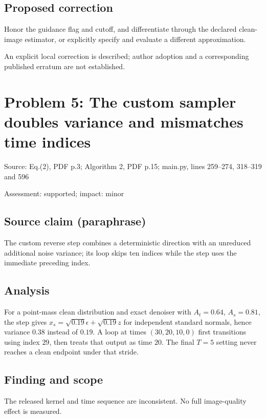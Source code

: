 \documentclass[11pt]{article}
\begin{document}
\subsection*{Proposed correction}

Honor the guidance flag and cutoff, and differentiate through the declared clean-image estimator, or explicitly specify and evaluate a different approximation.

An explicit local correction is described; author adoption and a corresponding published erratum are not established.

\section*{Problem 5: The custom sampler doubles variance and mismatches time indices}

Source: Eq.(2), PDF p.3; Algorithm 2, PDF p.15; main.py, lines 259–274, 318–319 and 596

Assessment: supported; impact: minor

\subsection*{Source claim (paraphrase)}

The custom reverse step combines a deterministic direction with an unreduced additional noise variance; its loop skips ten indices while the step uses the immediate preceding index.

\subsection*{Analysis}

For a point-mass clean distribution and exact denoiser with \(A_t=0.64\), \(A_s=0.81\), the step gives \(x_s=\sqrt{0.19}\epsilon+\sqrt{0.19}z\) for independent standard normals, hence variance \(0.38\) instead of \(0.19\). A loop at times \((30,20,10,0)\) first transitions using index \(29\), then treats that output as time \(20\). The final \(T=5\) setting never reaches a clean endpoint under that stride.

\subsection*{Finding and scope}

The released kernel and time sequence are inconsistent. No full image-quality effect is measured.
\end{document}
